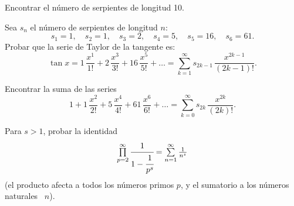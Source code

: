 \documentclass[12pt]{article}  %
\begin{document}

\medskip
\noindent 
Encontrar el n\'umero de serpientes de longitud 10.

\bigskip
{} Sea $s_n$ el n\'umero de serpientes de longitud $n$:
$$
s_1=1, \quad s_2=1, \quad s_3=2, \quad s_4=5, \quad s_5=16, \quad s_6=61.
$$
Probar que la serie de Taylor de la tangente es:
$$
\tan x=1\, \frac{x^1}{1!}+2\, \frac{x^3}{3!}+16\, \frac{x^5}{5!}+\dots=
\textstyle\sum\limits_{k=1}^{\infty} s_{2k-1}\, \frac{x^{2k-1}}{(2k-1)!}.
$$
 

\bigskip
{} Encontrar la suma de las series
$$
1+1\, \frac{x^2}{2!}+5\, \frac{x^4}{4!}+61\, \frac{x^6}{6!}+\dots=
\textstyle\sum\limits_{k=0}^{\infty} s_{2k}\,\frac{x^{2k}}{(2k)!}.
$$

\bigskip
{} Para $s>1$, probar la identidad
$$
\textstyle\prod\limits_{p=2}^{\infty} \cfrac{1}{1-\cfrac{1}{p^s}}=\sum\limits_{n=1}^{\infty} \frac{1}{n^s}
$$ 
(el producto afecta a todos los n\'umeros primos $p$, y el sumatorio a los n\'umeros naturales ~$n$).
\end{document}
